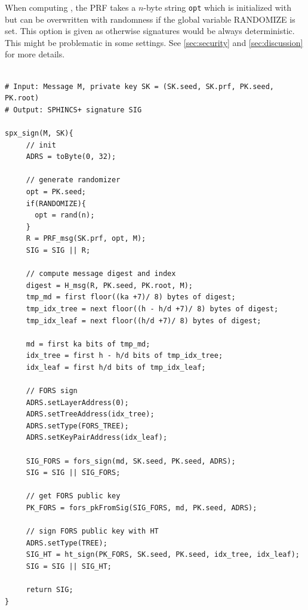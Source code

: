    When computing \Random, the PRF takes a $n$-byte string \texttt{opt} 
   which is initialized with \pseed but can be overwritten with randomness
   if the global variable RANDOMIZE is set. This option is given as otherwise
   \spx signatures would be always deterministic. This might be problematic in 
   some settings. See \autoref{sec:security} and \autoref{sec:discussion} for 
   more details.

\begin{lstlisting}[label=alg:spx:sign, mathescape, language=pseudoc,
                   caption=\spxsign\ -- Generating a \spx signature]
   
# Input: Message M, private key SK = (SK.seed, SK.prf, PK.seed, PK.root)
# Output: SPHINCS+ signature SIG

spx_sign(M, SK){
     // init
     ADRS = toByte(0, 32);
     
     // generate randomizer
     opt = PK.seed;
     if(RANDOMIZE){
       opt = rand(n);
     }
     R = PRF_msg(SK.prf, opt, M);
     SIG = SIG || R;
     
     // compute message digest and index
     digest = H_msg(R, PK.seed, PK.root, M);
     tmp_md = first floor((ka +7)/ 8) bytes of digest;
     tmp_idx_tree = next floor((h - h/d +7)/ 8) bytes of digest;
     tmp_idx_leaf = next floor((h/d +7)/ 8) bytes of digest;
     
     md = first ka bits of tmp_md;
     idx_tree = first h - h/d bits of tmp_idx_tree;
     idx_leaf = first h/d bits of tmp_idx_leaf;

     // FORS sign
     ADRS.setLayerAddress(0);
     ADRS.setTreeAddress(idx_tree);
     ADRS.setType(FORS_TREE);
     ADRS.setKeyPairAddress(idx_leaf);

     SIG_FORS = fors_sign(md, SK.seed, PK.seed, ADRS);
     SIG = SIG || SIG_FORS;
     
     // get FORS public key
     PK_FORS = fors_pkFromSig(SIG_FORS, md, PK.seed, ADRS);
     
     // sign FORS public key with HT
     ADRS.setType(TREE);
     SIG_HT = ht_sign(PK_FORS, SK.seed, PK.seed, idx_tree, idx_leaf);
     SIG = SIG || SIG_HT;
     
     return SIG;
}
\end{lstlisting}


